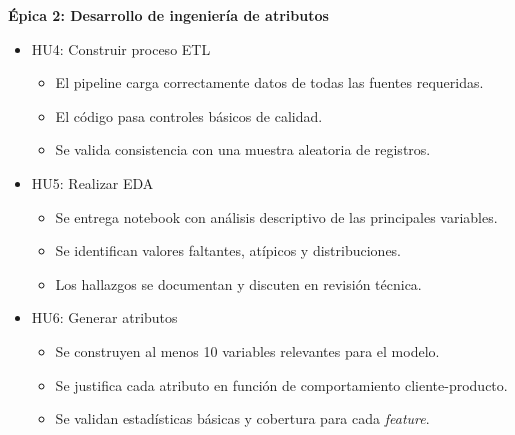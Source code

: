 \documentclass[
11pt, %
]{charter}
\begin{document}
\textbf{\'Epica 2: Desarrollo de ingenier\'ia de atributos}
\begin{itemize}
  \item HU4: Construir proceso ETL
  \begin{itemize}
    \item El pipeline carga correctamente datos de todas las fuentes requeridas.
    \item El código pasa controles básicos de calidad.
    \item Se valida consistencia con una muestra aleatoria de registros.
  \end{itemize}
  \item HU5: Realizar EDA
  \begin{itemize}
    \item Se entrega notebook con análisis descriptivo de las principales variables.
    \item Se identifican valores faltantes, atípicos y distribuciones.
    \item Los hallazgos se documentan y discuten en revisión técnica.
  \end{itemize}
  \item HU6: Generar atributos
  \begin{itemize}
    \item Se construyen al menos 10 variables relevantes para el modelo.
    \item Se justifica cada atributo en función de comportamiento cliente-producto.
    \item Se validan estadísticas básicas y cobertura para cada \textit{feature}.
  \end{itemize}
\end{itemize}
\end{document}
